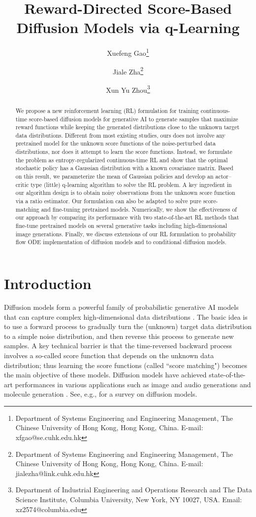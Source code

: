 \documentclass[11pt]{article}
\title{Reward-Directed Score-Based Diffusion Models via q-Learning}
\author{
	Xuefeng Gao\thanks{Department of Systems Engineering and Engineering Management, The Chinese University of Hong Kong, Hong Kong, China. E-mail: xfgao@se.cuhk.edu.hk}
	\and 
	Jiale Zha\thanks{Department of Systems Engineering and Engineering Management, The Chinese University of Hong Kong, Hong Kong, China. E-mail: jialezha@link.cuhk.edu.hk }
	\and 
	Xun Yu Zhou\thanks{Department of Industrial Engineering and Operations Research and The Data Science Institute, Columbia University, New York, NY 10027, USA. Email: xz2574@columbia.edu}
}
\begin{document}
\maketitle

\begin{abstract}
We propose a new reinforcement learning (RL) formulation for training continuous-time score-based diffusion models for generative AI to generate samples that maximize reward functions while keeping the generated distributions close to the unknown target data distributions. Different from most existing studies, ours does not involve any pretrained model for the unknown score functions of the noise-perturbed data distributions, nor does it attempt to learn the score functions.  Instead, we formulate the problem as entropy-regularized continuous-time RL and show that the optimal stochastic policy  has a Gaussian distribution with a known covariance matrix.
Based on this result, we parameterize the mean of Gaussian policies and develop an actor--critic type (little) q-learning algorithm to solve the RL problem. A key ingredient in our algorithm design is to obtain noisy observations from the unknown score function  via a ratio estimator. Our formulation can also be adapted to solve pure score-matching and fine-tuning pretrained models.
Numerically, we show the effectiveness of our approach by comparing its performance with two state-of-the-art RL methods that fine-tune pretrained models on several generative tasks including high-dimensional image generations. Finally, we discuss extensions of our RL formulation to probability flow ODE implementation of diffusion models and to conditional diffusion models.

\end{abstract}


\section{Introduction}



Diffusion models form a powerful family of probabilistic generative AI models that can capture complex high-dimensional data distributions \citep{Sohl2015, SongErmon2019, Ho2020, SongICLR2021}.
The basic idea is to use a forward process to gradually turn the (unknown) target data distribution to a simple noise distribution, and then reverse this process to generate new samples. A key technical barrier is that the time-reversed backward process involves
a so-called score function that depends on the unknown data distribution; thus learning the score functions (called ``score matching") becomes the main objective of these models.
Diffusion models have achieved state-of-the-art performances in various applications such as image and audio generations \citep{rombach2022high, ramesh2022hierarchical} and molecule generation \citep{hoogeboom2022equivariant, wu2022diffusion}. See, e.g., \cite{yang2022diffusion} for a survey on diffusion models.
\end{document}
